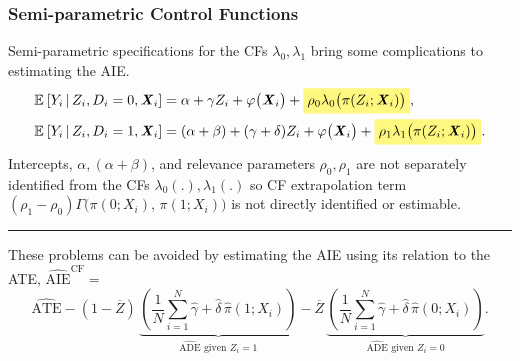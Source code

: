 \documentclass[dvipsnames]{beamer} %
\renewcommand{\vec}[1]{\boldsymbol{\mathit{#1}}}                           %
\newcommand{\Egiven}[3][]{\mathbb{E}_{#1} \left[ #2 \, \middle\vert \, #3 \right]} %
\renewcommand{\hat}[1]{\widehat{#1}}                                       %
\renewcommand{\bar}[1]{\overline{#1}}                                      %
\newcommand{\eqhighlight}[2]{\colorbox{#1!50}{$\displaystyle#2$}}
\begin{document}
\begin{frame}[noframenumbering]
    \frametitle{Semi-parametric Control Functions}
    \label{cf-semiparametric}
    Semi-parametric specifications for the CFs $\lambda_0, \lambda_1$ bring some complications to estimating the AIE.
    \begin{align*}
        \Egiven{Y_i}{Z_i, D_i = 0, \vec X_i} &=
            \alpha + \gamma Z_i + \varphi\big( \vec X_i \big)
            + \eqhighlight{yellow}{\rho_0 \lambda_0 \big( \pi(Z_i ; \vec X_i) \big)}, \\
        \Egiven{Y_i}{Z_i, D_i = 1, \vec X_i} &=
            (\alpha + \beta) + (\gamma + \delta) Z_i + \varphi\big( \vec X_i\big)
            + \eqhighlight{yellow}{\rho_1 \lambda_1 \big( \pi(Z_i ; \vec X_i) \big)}.
    \end{align*}
    Intercepts, $\alpha, (\alpha + \beta)$, and relevance parameters $\rho_0, \rho_1$ are not separately identified from the CFs $\lambda_0(.), \lambda_1(.)$ so CF extrapolation term\\ $(\rho_1 - \rho_0) \Gamma \big(\pi(0; \vec X_i), \, \pi(1; \vec X_i) \big)$ is not directly identified or estimable.

    \par\noindent\rule{\textwidth}{0.4pt}    
    These problems can be avoided by estimating the AIE using its relation to the ATE, $\hat{\text{AIE}}^{\text{CF}} =$
    \[ \hat{\text{ATE}}
        - (1 - \bar Z) \, \underbrace{\left( 
            \frac 1N \sum_{i = 1}^N \hat\gamma + \hat \delta \, \hat\pi(1; \vec X_i) \right)}_{\hat{\text{ADE}}\text{ given }Z_i = 1}
        - \bar Z \, \underbrace{\left(
            \frac 1N \sum_{i = 1}^N \hat\gamma + \hat \delta \, \hat\pi(0; \vec X_i)  \right)}_{\hat{\text{ADE}}\text{ given }Z_i = 0}. \]
\end{frame}
\end{document}
